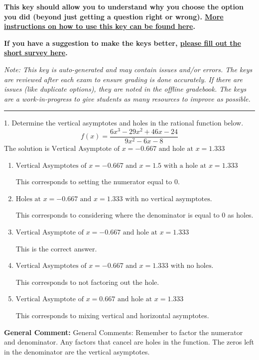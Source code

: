 \documentclass{extbook}[14pt]
\begin{document}
\textbf{This key should allow you to understand why you choose the option you did (beyond just getting a question right or wrong). \href{https://xronos.clas.ufl.edu/mac1105spring2020/courseDescriptionAndMisc/Exams/LearningFromResults}{More instructions on how to use this key can be found here}.}

\textbf{If you have a suggestion to make the keys better, \href{https://forms.gle/CZkbZmPbC9XALEE88}{please fill out the short survey here}.}

\textit{Note: This key is auto-generated and may contain issues and/or errors. The keys are reviewed after each exam to ensure grading is done accurately. If there are issues (like duplicate options), they are noted in the offline gradebook. The keys are a work-in-progress to give students as many resources to improve as possible.}

\rule{\textwidth}{0.4pt}

1. Determine the vertical asymptotes and holes in the rational function below.
\[ f(x) = \frac{6x^{3} -29 x^{2} +46 x -24}{9x^{2} -6 x -8} \] 
The solution is $ \text{Vertical Asymptote of } x = -0.667 \text{ and hole at } x = 1.333 $ 

\begin{enumerate}[label=\Alph*.] 
\item $ \text{Vertical Asymptotes of } x = -0.667 \text{ and } x = 1.5 \text{ with a hole at } x = 1.333 $ 

 This corresponds to setting the numerator equal to 0. 
\item $ \text{Holes at } x = -0.667 \text{ and } x = 1.333 \text{ with no vertical asymptotes.} $ 

 This corresponds to considering where the denominator is equal to 0 as holes. 
\item $ \text{Vertical Asymptote of } x = -0.667 \text{ and hole at } x = 1.333 $ 

 This is the correct answer. 
\item $ \text{Vertical Asymptotes of } x = -0.667 \text{ and } x = 1.333 \text{ with no holes.} $ 

 This corresponds to not factoring out the hole. 
\item $ \text{Vertical Asymptote of } x = 0.667 \text{ and hole at } x = 1.333 $ 

 This corresponds to mixing vertical and horizontal asymptotes. 
\end{enumerate} 
 
\textbf{General Comment:} General Comments: Remember to factor the numerator and denominator. Any factors that cancel are holes in the function. The zeros left in the denominator are the vertical asymptotes. 
\end{document}
